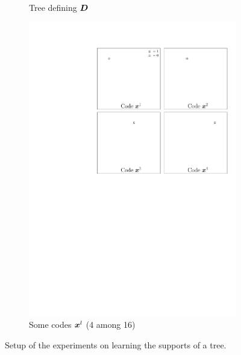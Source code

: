 \begin{figure}[!h]
\begin{subfigure}[b]{0.325\textwidth}
	\caption{Tree defining $\bm{D}$}\label{fig_learntree_setup-tree}
\end{subfigure}
\begin{subfigure}[b]{0.325\textwidth}\centering
\includegraphics[width=\textwidth]{figures/tree-learn/codes.pdf} 
	\caption{Some codes $\bm{x}^l$ (4 among 16)}\label{fig_learntree_setup-codes}
\end{subfigure}
\caption{Setup of the experiments on learning the supports of a tree.}\label{fig_learntree_setup}
\end{figure}

